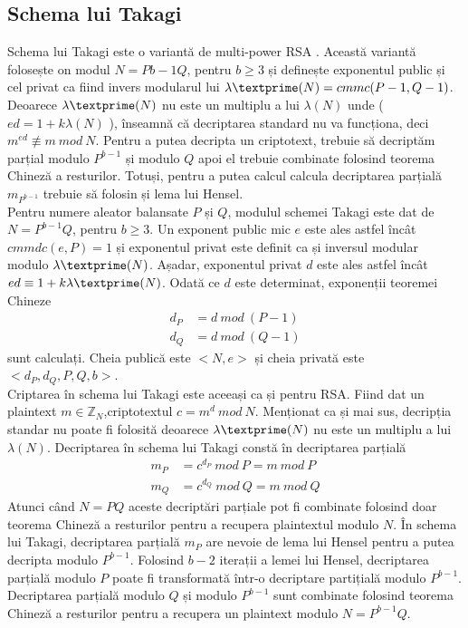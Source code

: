 \documentclass[12pt, oneside]{book}
\begin{document}
		  \subsection{Schema lui Takagi}
		  Schema lui Takagi este o variantă de multi-power RSA \cite{takagi}. Această variantă folosește on modul $N=P{b-1}Q$, pentru $b \geqslant 3$ și definește exponentul public și cel privat ca fiind invers modularul lui $\lambda \textprime (N) =cmmc(P-1,Q-1)$. Deoarece $\lambda \textprime (N)$ nu este un multiplu a lui $\lambda(N)$ unde ( $ed=1+k\lambda(N)$ ), înseamnă că decriptarea standard nu va funcționa, deci $m^{ed} \not\equiv m \ mod \ N$. Pentru a putea decripta un criptotext, trebuie să decriptăm parțial modulo $P^{b-1}$ și modulo $Q$ apoi el trebuie combinate folosind teorema Chineză a resturilor. Totuși, pentru a putea calcul calcula decriptarea parțială $m_{P^{b-1}}$ trebuie să folosin și lema lui Hensel.\\
		  Pentru numere aleator balansate $P$ și $Q$, modulul schemei Takagi este dat de $N=P^{b-1}Q$, pentru $b \geqslant 3$. Un exponent public mic $e$ este ales astfel încât$cmmdc(e,P)=1$ și exponentul privat este definit ca și inversul modular modulo $\lambda \textprime (N)$. Așadar, exponentul privat $d$ este ales astfel încât $ed \equiv 1+k\lambda \textprime (N)$. Odată ce $d$ este determinat, exponenții  teoremei Chineze
		  \begin{align*}
		  d_P &= d \ mod \ (P-1) \\
		  d_Q &= d \ mod \ (Q-1)
		  \end{align*}
sunt calculați. Cheia publică este $<N,e>$ și cheia privată este$<d_P,d_Q,P,Q,b>$. \\
Criptarea în schema lui Takagi este aceeași ca și pentru RSA. Fiind dat un plaintext $ m \in \mathbb{Z}_N$,criptotextul $ c= m^d \ mod \ N$. Menționat ca și mai sus, decripția standar nu poate fi folosită deoarece $ \lambda \textprime (N)$ nu este un multiplu a lui $\lambda(N)$. Decriptarea în  schema lui Takagi constă în decriptarea parțială
\begin{align*}
m_P &= c^{d_P} \ mod \ P = m \ mod \ P \\
m_Q &= c^{d_Q} \ mod \ Q = m \ mod \ Q 
\end{align*} 
Atunci când $N=PQ$ aceste decriptări parțiale pot fi combinate folosind doar teorema Chineză a resturilor pentru a recupera plaintextul modulo $N$. În schema lui Takagi, decriptarea parțială $m_P$ are nevoie de lema lui Hensel pentru a putea decripta modulo  $P^{b-1}$. Folosind $b-2$ iterații a lemei lui Hensel, decriptarea parțială modulo $P$ poate fi transformată într-o decriptare partițială modulo $P^{b-1}$. Decriptarea parțială modulo $Q$ și modulo $P^{b-1}$ sunt combinate folosind teorema Chineză a resturilor pentru a recupera un plaintext modulo $N=P^{b-1}Q$.
\end{document}
